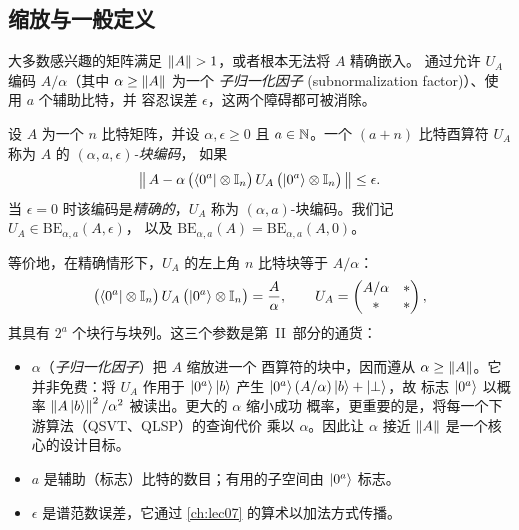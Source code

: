 \subsection*{缩放与一般定义}

大多数感兴趣的矩阵满足 $\left\lVert A \right\rVert>1$，或者根本无法将 $A$ 精确嵌入。
通过允许 $U_A$ 编码 $A/\alpha$（其中 $\alpha\ge\left\lVert A \right\rVert$ 为一个
\emph{子归一化因子} (subnormalization factor)）、使用 $a$ 个辅助比特，并
容忍误差 $\epsilon$，这两个障碍都可被消除。

\begin{definition}[块编码]
\label{def:lec06-be}
设 $A$ 为一个 $n$ 比特矩阵，并设 $\alpha,\epsilon\ge0$ 且 $a\in\mathbb{N}$。一个
$(a+n)$ 比特酉算符 $U_A$ 称为 $A$ 的 \emph{$(\alpha,a,\epsilon)$-块编码}，
如果
\begin{equation}
  \left\lVert \,A-\alpha\,\bigl(\bra{0^a}\otimes\mathbb{I}_n\bigr)\,U_A\,
         \bigl(\ket{0^a}\otimes\mathbb{I}_n\bigr)\, \right\rVert\le\epsilon.
  \label{eq:lec06-bedef}
\end{equation}
当 $\epsilon=0$ 时该编码是\emph{精确的}，$U_A$ 称为
$(\alpha,a)$-块编码。我们记 $U_A\in\mathrm{BE}_{\alpha,a}(A,\epsilon)$，
以及 $\mathrm{BE}_{\alpha,a}(A)=\mathrm{BE}_{\alpha,a}(A,0)$。
\end{definition}

等价地，在精确情形下，$U_A$ 的左上角 $n$ 比特块等于
$A/\alpha$：
\begin{equation}
  \bigl(\bra{0^a}\otimes\mathbb{I}_n\bigr)\,U_A\,\bigl(\ket{0^a}\otimes\mathbb{I}_n\bigr)
  =\frac{A}{\alpha},
  \qquad
  U_A=\begin{pmatrix} A/\alpha & \ast\\ \ast & \ast\end{pmatrix},
  \label{eq:lec06-bealt}
\end{equation}
其具有 $2^{a}$ 个块行与块列。这三个参数是第~II~部分的通货：
\begin{itemize}[leftmargin=1.4em,nosep]
  \item $\alpha$（\emph{子归一化因子}）把 $A$ 缩放进一个
        酉算符的块中，因而遵从 $\alpha\ge\left\lVert A \right\rVert$。它并非免费：将 $U_A$ 作用于
        $\ket{0^a}\ket{b}$ 产生 $\ket{0^a}(A/\alpha)\ket{b}+\ket{\perp}$，故
        标志 $\ket{0^a}$ 以概率
        $\left\lVert A\ket{b} \right\rVert^2/\alpha^2$ 被读出。更大的 $\alpha$ 缩小成功
        概率，更重要的是，将每一个下游算法（QSVT、QLSP）的查询代价
        乘以 $\alpha$。因此让 $\alpha$ 接近
        $\left\lVert A \right\rVert$ 是一个核心的设计目标。
  \item $a$ 是辅助（标志）比特的数目；有用的子空间由
        $\ket{0^a}$ 标志。
  \item $\epsilon$ 是谱范数误差，它通过 \cref{ch:lec07} 的算术以加法方式传播。
\end{itemize}

